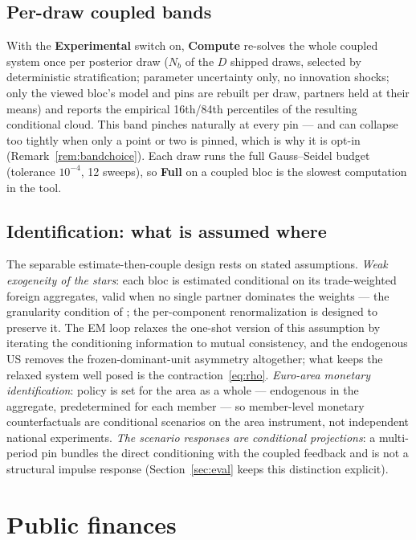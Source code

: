 \documentclass[11pt]{article}
\newcommand{\ui}[1]{\textbf{#1}}
\theoremstyle{plain}
\theoremstyle{remark}
\begin{document}
\subsection{Per-draw coupled bands}\label{sec:gvarbands}

With the \ui{Experimental} switch on, \ui{Compute} re-solves the whole
coupled system once per posterior draw ($N_b$ of the $D$ shipped draws,
selected by deterministic stratification; parameter uncertainty only, no
innovation shocks; only the viewed bloc's model and pins are rebuilt per
draw, partners held at their means) and reports the empirical
16th/84th percentiles of the resulting conditional cloud. This band
pinches naturally at every pin --- and can collapse too tightly when
only a point or two is pinned, which is why it is opt-in
(Remark~\ref{rem:bandchoice}). Each draw runs the full Gauss--Seidel
budget (tolerance $10^{-4}$, 12 sweeps), so \ui{Full} on a coupled bloc
is the slowest computation in the tool.

\subsection{Identification: what is assumed where}\label{sec:identif}

The separable estimate-then-couple design rests on stated assumptions.
\emph{Weak exogeneity of the stars}: each bloc is estimated conditional
on its trade-weighted foreign aggregates, valid when no single partner
dominates the weights --- the granularity condition of
\citet{ChudikPesaran2016}; the per-component renormalization is designed
to preserve it. The EM loop relaxes the one-shot version of this
assumption by iterating the conditioning information to mutual
consistency, and the endogenous US removes the frozen-dominant-unit
asymmetry altogether; what keeps the relaxed system well posed is the
contraction~\eqref{eq:rho}. \emph{Euro-area monetary identification}:
policy is set for the area as a whole --- endogenous in the aggregate,
predetermined for each member --- so member-level monetary
counterfactuals are conditional scenarios on the area instrument, not
independent national experiments. \emph{The scenario responses are
conditional projections}: a multi-period pin bundles the direct
conditioning with the coupled feedback and is not a structural impulse
response (Section~\ref{sec:eval} keeps this distinction explicit).

\section{Public finances}\label{sec:fiscal}
\end{document}
